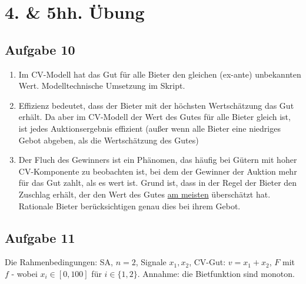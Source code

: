\documentclass[12pt]{extreport} %
\theoremstyle{named}
\theoremstyle{itshape}
\theoremstyle{normal}
\begin{document}
\section*{4. \& 5hh. Übung}

\subsection*{Aufgabe 10}

\begin{enumerate}[label=\alph*\upshape)]
	\item Im CV-Modell hat das Gut für alle Bieter den gleichen (ex-ante) unbekannten Wert. Modelltechnische Umsetzung im Skript.
	\item Effizienz bedeutet, dass der Bieter mit der höchsten Wertschätzung das Gut erhält. Da aber im CV-Modell der Wert des Gutes für alle Bieter gleich ist, ist jedes Auktionsergebnis effizient (außer wenn alle Bieter eine niedriges Gebot abgeben, als die Wertschätzung des Gutes)
	\item Der Fluch des Gewinners ist ein Phänomen, das häufig bei Gütern mit hoher CV-Komponente zu beobachten ist, bei dem der Gewinner der Auktion mehr für das Gut zahlt, als es wert ist. Grund ist, dass in der Regel der Bieter den Zuschlag erhält, der den Wert des Gutes \underline{am meisten} überschätzt hat. ~\\
		Rationale Bieter berücksichtigen genau dies bei ihrem Gebot.
\end{enumerate}

\subsection*{Aufgabe 11}

Die Rahmenbedingungen: SA, $n = 2$, Signale $x_1, x_2$, CV-Gut: $v = x_1 + x_2$, $F$ mit $f$ - wobei $x_{i} \in [0, 100]$ für $i \in \{1, 2 \}$. Annahme: die Bietfunktion sind monoton.
\end{document}

